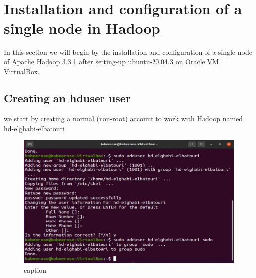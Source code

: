 \chapter{Installation and configuration of a single node in Hadoop}
\par In this section we will begin by the installation and configuration of a single node of Apache Hadoop 3.3.1 after setting-up ubuntu-20.04.3 on Oracle VM VirtualBox.
\begin{spacing}{1.2}
\section{Creating an hduser user }

\par we start by creating a normal (non-root) account to work with Hadoop named hd-elghabi-elbatouri
\\
\begin{figure}[!htb] 
\begin{center} 
\includegraphics[width=1\linewidth]{Big_Data/Hadoop/Apache Hadoop Installation/Adding new user to sudo group.jpg}
\end{center} 
\caption{caption} 
\end{figure} 
\FloatBarrier




\end{spacing}
